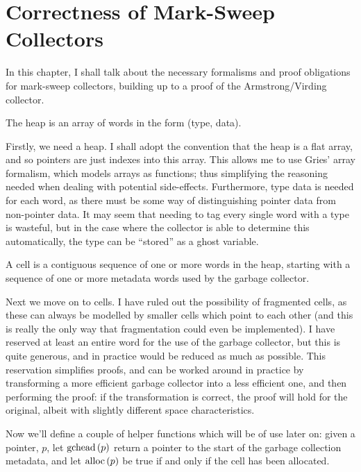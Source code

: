 \chapter{Correctness of Mark-Sweep Collectors}

In this chapter, I shall talk about the necessary formalisms and proof
obligations for \gls{mark-sweep} \glspl{collector}, building up to a
proof of the Armstrong/Virding\cite{Armstrong95} \gls{collector}.

\begin{definition}[Heap]
  The heap is an array of words in the form (type, data).
\end{definition}

Firstly, we need a \gls{heap}. I shall adopt the convention that the
\gls{heap} is a flat array, and so \glspl{pointer} are just indexes
into this array. This allows me to use Gries' array
formalism\cite{Gries87}, which models arrays as functions; thus
simplifying the reasoning needed when dealing with potential
side-effects. Furthermore, type data is needed for each word, as there
must be some way of distinguishing \gls{pointer} data from non-pointer
data. It may seem that needing to tag every single word with a type is
wasteful, but in the case where the \gls{collector} is able to
determine this automatically, the type can be ``stored'' as a ghost
variable.

\begin{definition}[Cell]
  A cell is a contiguous sequence of one or more words in the heap,
  starting with a sequence of one or more metadata words used by the
  garbage collector.
\end{definition}

Next we move on to \glspl{cell}. I have ruled out the possibility of
fragmented \glspl{cell}, as these can always be modelled by smaller
\glspl{cell} which point to each other (and this is really the only
way that fragmentation could even be implemented). I have reserved at
least an entire word for the use of the \gls{garbage collector}, but
this is quite generous, and in practice would be reduced as much as
possible. This reservation simplifies proofs, and can be worked around
in practice by transforming a more efficient \gls{garbage collector}
into a less efficient one, and then performing the proof: if the
transformation is correct, the proof will hold for the original,
albeit with slightly different space characteristics.

Now we'll define a couple of helper functions which will be of use
later on: given a \gls{pointer}, $p$, let $\mathrm{gchead}\left(p\right)$ return a
pointer to the start of the \gls{garbage collection} metadata, and let
$\mathrm{alloc}\left(p\right)$ be true if and only if the \gls{cell} has been allocated.

